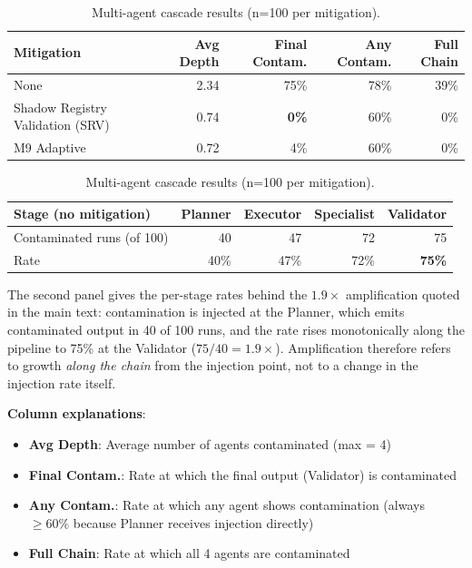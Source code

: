 \documentclass{article}
\theoremstyle{plain}
\theoremstyle{definition}
\begin{document}
\begin{table}[!htbp]
\centering
\caption{Multi-agent cascade results (n=100 per mitigation).}
\label{tab:multiagent-results}
\small
\begin{tabular}{lrrrr}
\toprule
\textbf{Mitigation} & \textbf{Avg Depth} & \textbf{Final Contam.} & \textbf{Any Contam.} & \textbf{Full Chain} \\
\midrule
None & 2.34 & 75\% & 78\% & 39\% \\
Shadow Registry Validation (SRV) & 0.74 & \textbf{0\%} & 60\% & 0\% \\
M9 Adaptive & 0.72 & 4\% & 60\% & 0\% \\
\bottomrule
\end{tabular}

\vspace{2mm}
\begin{tabular}{lrrrr}
\toprule
\textbf{Stage (no mitigation)} & \textbf{Planner} & \textbf{Executor} & \textbf{Specialist} & \textbf{Validator} \\
\midrule
Contaminated runs (of 100) & 40 & 47 & 72 & 75 \\
Rate & 40\% & 47\% & 72\% & \textbf{75\%} \\
\bottomrule
\end{tabular}
\end{table}

The second panel gives the per-stage rates behind the $1.9\times$ amplification quoted in the main text: contamination is injected at the Planner, which emits contaminated output in 40 of 100 runs, and the rate rises monotonically along the pipeline to 75\% at the Validator ($75/40 = 1.9\times$). Amplification therefore refers to growth \emph{along the chain} from the injection point, not to a change in the injection rate itself.

\textbf{Column explanations}:
\begin{itemize}
    \item \textbf{Avg Depth}: Average number of agents contaminated (max = 4)
    \item \textbf{Final Contam.}: Rate at which the final output (Validator) is contaminated
    \item \textbf{Any Contam.}: Rate at which any agent shows contamination (always $\geq 60\%$ because Planner receives injection directly)
    \item \textbf{Full Chain}: Rate at which all 4 agents are contaminated
\end{itemize}
\end{document}
